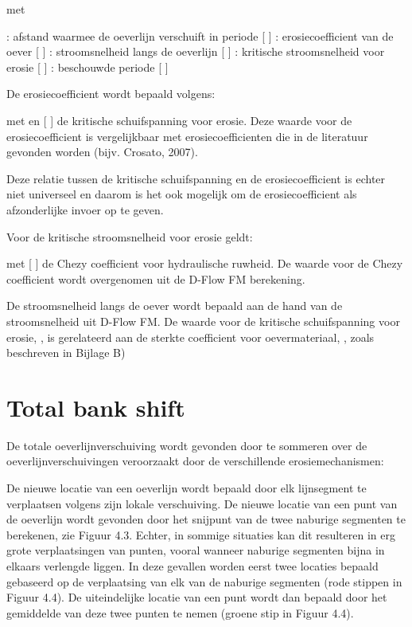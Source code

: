 	
met

 	: afstand waarmee de oeverlijn verschuift in periode   [ ]
 	: erosiecoefficient van de oever [ ]
 	: stroomsnelheid langs de oeverlijn [ ]
 	: kritische stroomsnelheid voor erosie [ ]
 	: beschouwde periode [ ]

De erosiecoefficient wordt bepaald volgens:

	
met     en   [ ] de kritische schuifspanning voor erosie.
Deze waarde voor de erosiecoefficient is vergelijkbaar met erosiecoefficienten die in de literatuur gevonden worden (bijv.
Crosato, 2007).

Deze relatie tussen de kritische schuifspanning en de erosiecoefficient is echter niet universeel en daarom is het ook mogelijk om de erosiecoefficient als afzonderlijke invoer op te geven.

Voor de kritische stroomsnelheid voor erosie geldt:

	

met   [ ] de Chezy coefficient voor hydraulische ruwheid.
De waarde voor de Chezy coefficient wordt overgenomen uit de D-Flow FM berekening.

De stroomsnelheid langs de oever wordt bepaald aan de hand van de stroomsnelheid uit D-Flow FM.
De waarde voor de kritische schuifspanning voor erosie,  , is gerelateerd aan de sterkte coefficient voor oevermateriaal,  , zoals beschreven in Bijlage B)

\section{Total bank shift}

De totale oeverlijnverschuiving wordt gevonden door te sommeren over de oeverlijnverschuivingen veroorzaakt door de verschillende erosiemechanismen:

	

De nieuwe locatie van een oeverlijn wordt bepaald door elk lijnsegment te verplaatsen volgens zijn lokale verschuiving.
De nieuwe locatie van een punt van de oeverlijn wordt gevonden door het snijpunt van de twee naburige segmenten te berekenen, zie Figuur 4.3.
Echter, in sommige situaties kan dit resulteren in erg grote verplaatsingen van punten, vooral wanneer naburige segmenten bijna in elkaars verlengde liggen.
In deze gevallen worden eerst twee locaties bepaald gebaseerd op de verplaatsing van elk van de naburige segmenten (rode stippen in Figuur 4.4).
De uiteindelijke locatie van een punt wordt dan bepaald door het gemiddelde van deze twee punten te nemen (groene stip in Figuur 4.4).


